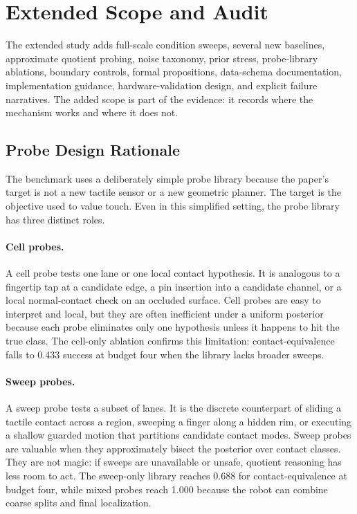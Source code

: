 \documentclass{article}
\begin{document}
\section{Extended Scope and Audit}

The extended study adds full-scale condition sweeps, several new baselines, approximate quotient probing, noise taxonomy, prior stress, probe-library ablations, boundary controls, formal propositions, data-schema documentation, implementation guidance, hardware-validation design, and explicit failure narratives. The added scope is part of the evidence: it records where the mechanism works and where it does not.

\subsection{Probe Design Rationale}

The benchmark uses a deliberately simple probe library because the paper's target is not a new tactile sensor or a new geometric planner. The target is the objective used to value touch. Even in this simplified setting, the probe library has three distinct roles.

\paragraph{Cell probes.}
A cell probe tests one lane or one local contact hypothesis. It is analogous to a fingertip tap at a candidate edge, a pin insertion into a candidate channel, or a local normal-contact check on an occluded surface. Cell probes are easy to interpret and local, but they are often inefficient under a uniform posterior because each probe eliminates only one hypothesis unless it happens to hit the true class. The cell-only ablation confirms this limitation: contact-equivalence falls to 0.433 success at budget four when the library lacks broader sweeps.

\paragraph{Sweep probes.}
A sweep probe tests a subset of lanes. It is the discrete counterpart of sliding a tactile contact across a region, sweeping a finger along a hidden rim, or executing a shallow guarded motion that partitions candidate contact modes. Sweep probes are valuable when they approximately bisect the posterior over contact classes. They are not magic: if sweeps are unavailable or unsafe, quotient reasoning has less room to act. The sweep-only library reaches 0.688 for contact-equivalence at budget four, while mixed probes reach 1.000 because the robot can combine coarse splits and final localization.
\end{document}
